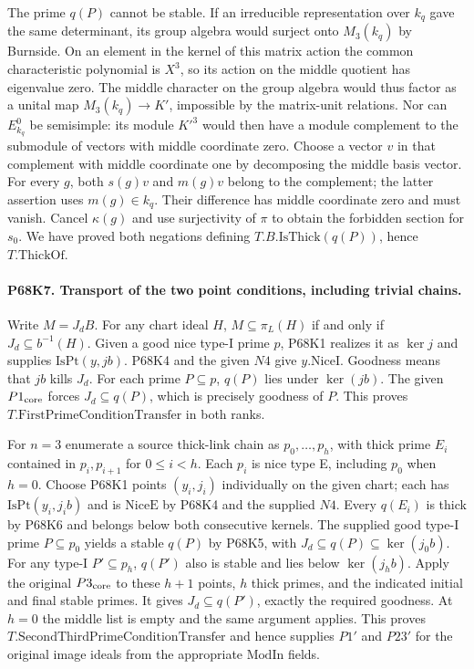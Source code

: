 The prime $q(P)$ cannot be stable. If an irreducible representation
over $k_q$ gave the same determinant, its group algebra would
surject onto $M_3(k_q)$ by Burnside. On an element in the kernel
of this matrix action the common characteristic polynomial is
$X^3$, so its action on the middle quotient has eigenvalue zero.
The middle character on the group algebra would thus factor as
a unital map $M_3(k_q)\to K'$, impossible by the matrix-unit
relations. Nor can $E^0_{k_q}$ be semisimple: its module $K'^3$
would then have a module complement to the submodule of vectors
with middle coordinate zero. Choose a vector $v$ in that
complement with middle coordinate one by decomposing the middle
basis vector. For every $g$, both $s(g)v$ and $m(g)v$ belong
to the complement; the latter assertion uses $m(g)\in k_q$.
Their difference has middle coordinate zero and must vanish.
Cancel $\kappa(g)$ and use surjectivity of $\pi$ to obtain
the forbidden section for $s_0$. We have proved both negations
defining $T.B.\mathrm{IsThick}(q(P))$, hence $T.\mathrm{ThickOf}$.

\paragraph{P68K7. Transport of the two point conditions, including trivial chains.}
Write $M=J_dB$. For any chart ideal $H$,
$M\subseteq\pi_L(H)$ if and only if $J_d\subseteq b^{-1}(H)$.
Given a good nice type-I prime $p$, P68K1 realizes it as
$\ker j$ and supplies $\mathrm{IsPt}(y,jb)$. P68K4 and the
given $N4$ give $y.\mathrm{NiceI}$. Goodness means that $jb$
kills $J_d$. For each prime $P\subseteq p$, $q(P)$ lies under
$\ker(jb)$. The given $P1_{\rm core}$ forces $J_d\subseteq q(P)$,
which is precisely goodness of $P$. This proves
$T.\mathrm{FirstPrimeConditionTransfer}$ in both ranks.

For $n=3$ enumerate a source thick-link chain as
$p_0,\ldots,p_h$, with thick prime $E_i$ contained in
$p_i,p_{i+1}$ for $0\le i<h$. Each $p_i$ is nice type E,
including $p_0$ when $h=0$. Choose P68K1 points
$(y_i,j_i)$ individually on the given chart; each has
$\mathrm{IsPt}(y_i,j_ib)$ and is $\mathrm{NiceE}$ by P68K4
and the supplied $N4$. Every $q(E_i)$ is thick by P68K6 and
belongs below both consecutive kernels. The supplied good
type-I prime $P\subseteq p_0$ yields a stable $q(P)$ by P68K5,
with $J_d\subseteq q(P)\subseteq\ker(j_0b)$. For any
type-I $P'\subseteq p_h$, $q(P')$ also is stable and lies
below $\ker(j_hb)$. Apply the original $P3_{\rm core}$ to
these $h+1$ points, $h$ thick primes, and the indicated initial
and final stable primes. It gives $J_d\subseteq q(P')$, exactly
the required goodness. At $h=0$ the middle list is empty and
the same argument applies. This proves
$T.\mathrm{SecondThirdPrimeConditionTransfer}$ and hence supplies
$P1'$ and $P23'$ for the original image ideals from the appropriate
$\mathrm{ModIn}$ fields.
